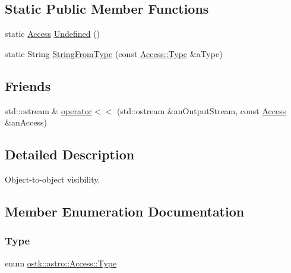 \subsection*{Static Public Member Functions}
\begin{DoxyCompactItemize}
\item 
static \hyperlink{classostk_1_1astro_1_1_access}{Access} \hyperlink{classostk_1_1astro_1_1_access_aa7770be15907d9dabc3ae9a9490e9bad}{Undefined} ()
\item 
static String \hyperlink{classostk_1_1astro_1_1_access_ada64e6a55fe3505b548bdb2651f122e3}{String\+From\+Type} (const \hyperlink{classostk_1_1astro_1_1_access_aac00b1a6ead7db92eba5b71e43235c93}{Access\+::\+Type} \&a\+Type)
\end{DoxyCompactItemize}
\subsection*{Friends}
\begin{DoxyCompactItemize}
\item 
std\+::ostream \& \hyperlink{classostk_1_1astro_1_1_access_a84eabd1ef8d3eeff0b6a80851727a2b4}{operator$<$$<$} (std\+::ostream \&an\+Output\+Stream, const \hyperlink{classostk_1_1astro_1_1_access}{Access} \&an\+Access)
\end{DoxyCompactItemize}


\subsection{Detailed Description}
Object-\/to-\/object visibility. 

\subsection{Member Enumeration Documentation}
\mbox{\label{classostk_1_1astro_1_1_access_aac00b1a6ead7db92eba5b71e43235c93}} 
\subsubsection{\texorpdfstring{Type}{Type}}
{\footnotesize\ttfamily enum \hyperlink{classostk_1_1astro_1_1_access_aac00b1a6ead7db92eba5b71e43235c93}{ostk\+::astro\+::\+Access\+::\+Type}\hspace{0.3cm}{\ttfamily [strong]}}

